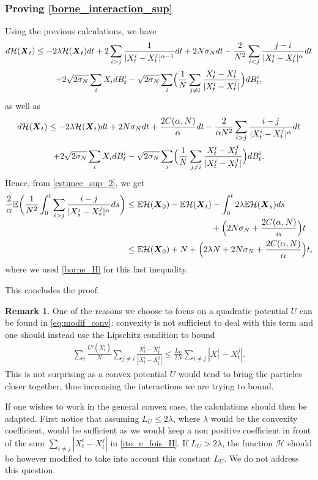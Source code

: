 \documentclass[10pt]{amsart}
\newcommand{\bX}{{\boldsymbol{X}}}
\theoremstyle{plain}
\theoremstyle{definition}
\newtheorem{remark}{Remark}[section]
\begin{document}
\subsubsection*{Proving \eqref{borne_interaction_sup}} Using the previous calculations, we have
\begin{multline*}
d\mathcal{H}(\bX_t)\leq -2\lambda \mathcal{H}(\bX_t)dt+2\sum_{i>j}\frac{1}{|X^i_t-X^j_t|^{\alpha-1}}dt+2N\sigma_Ndt-\frac{2}{N^2}\sum_{i<j}\frac{j-i}{|X^i_t-X^j_t|^\alpha}dt\\
+2\sqrt{2\sigma_N}\sum_iX_idB^i_t-\sqrt{2\sigma_N}\sum_i\Bigl(\frac{1}{N}\sum_{j\neq i}\frac{X^i_t-X^j_t}{|X^i_t-X^j_t|}\Bigr)dB^i_t,
\end{multline*}
as well as
\begin{multline}
d\mathcal{H}(\bX_t)\leq -2\lambda \mathcal{H}(\bX_t)dt+2N\sigma_Ndt+\frac{2C(\alpha,N)}{\alpha}dt-\frac{2}{\alpha N^2}\sum_{i>j}\frac{i-j}{|X^i_t-X^j_t|^{\alpha}}dt\\
+2\sqrt{2\sigma_N}\sum_iX_idB^i_t-\sqrt{2\sigma_N}\sum_i\Bigl(\frac{1}{N}\sum_{j\neq i}\frac{X^i_t-X^j_t}{|X^i_t-X^j_t|}\Bigr)dB^i_t\label{estimee_sup_2}.
\end{multline}
Hence, from \eqref{estimee_sup_2}, we get
\begin{align*}
\frac{2}{\alpha}\mathbb{E}\biggl(\frac{1}{N^2}\int_0^t\sum_{i>j}\frac{i-j}{|X^i_s-X^j_s|^{\alpha}}ds\biggr)&\leq \mathbb{E}\mathcal{H}(\bX_0)-\mathbb{E}\mathcal{H}(\bX_t)-\int_0^t2\lambda\mathbb{E}\mathcal{H}(\bX_s)ds\\[-5pt]
&\hspace*{3.5cm}+\Bigl(2N\sigma_N+\frac{2C(\alpha,N)}{\alpha}\Bigr)t\\
&\leq \mathbb{E}\mathcal{H}(\bX_0)+N+\Bigl(2\lambda N+2N\sigma_N+\frac{2C(\alpha,N)}{\alpha}\Bigr)t,
\end{align*}
where we used \eqref{borne_H} for this last inequality.

This concludes the proof.

\begin{remark}\label{rem:modif_conv}
One of the reasons we choose to focus on a quadratic potential $U$ can be found in \eqref{eq:modif_conv}: convexity is not sufficient to deal with this term and one should instead use the Lipschitz condition to bound
\begin{align*}
\sum_i\frac{U'\left(X^i_t\right)}{N}\sum_{j\neq i}\frac{X^i_t-X^j_t}{|X^i_t-X^j_t|}\leq\frac{L_U}{2N}\sum_{i\neq j}|X^i_t-X^j_t|.
\end{align*}
This is not surprising as a convex potential $U$ would tend to bring the particles closer together, thus increasing the interactions we are trying to bound.

If one wishes to work in the general convex case, the calculations should then be adapted. First notice that assuming $L_U\leq 2\lambda$, where $\lambda$ would be the convexity coefficient, would be sufficient as we would keep a non positive coefficient in front of the sum $\sum_{i\neq j}|X^i_t-X^j_t|$ in \eqref{ito_e_fois_H}. If $L_U> 2\lambda$, the function $\mathcal{H}$ should be however modified to take into account this constant $L_U$. We do not address this question.
\end{remark}
\end{document}
